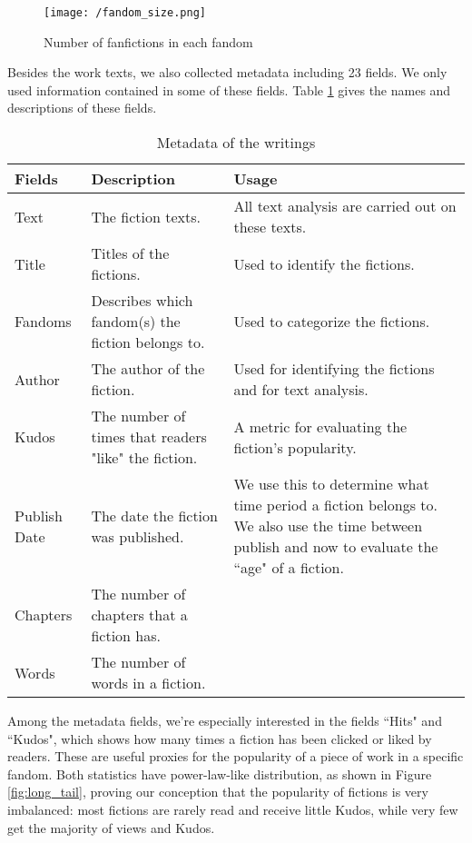 \documentclass[a4paper]{article}
\begin{document}
\begin{figure}[htbp]
\begin{center}
\texttt{[image: /fandom\_size.png]}
\caption{Number of fanfictions in each fandom}
\label{fig:fandom_size}
\end{center}
\end{figure}


Besides the work texts, we also collected metadata including 23 fields. We only used information contained in some of these fields. Table \ref{tab:metadata} gives the names and descriptions of these fields. 

\begin{table}[htp]
\caption{Metadata of the writings}
\begin{center}
\begin{tabular}[width=0.8\textwidth]{p{2cm}|p{4cm}|p{5cm}}
  \hline			
 Fields & Description & Usage\\ 
   \hline			
Text & The fiction texts. & All text analysis are carried out on these texts.\\\hline
Title & Titles of the fictions. & Used to identify the fictions. \\\hline
Fandoms & Describes which fandom(s) the fiction belongs to. & Used to categorize the fictions.\\\hline
Author & The author of the fiction. & Used for identifying the fictions and for text analysis. \\\hline
Kudos & The number of times that readers "like" the fiction. &  A metric for evaluating the fiction's popularity.\\\hline
Publish Date & The date the fiction was published. & We use this to determine what time period a fiction belongs to. We also use the time between publish and now to evaluate the ``age" of a fiction.\\\hline
Chapters & The number of chapters that a fiction has. \\\hline
Words & The number of words in a fiction.\\\hline

\hline
\end{tabular}
\end{center}
\label{tab:metadata}
\end{table}%

Among the metadata fields, we're especially interested in the fields ``Hits" and ``Kudos", which shows how many times a fiction has been clicked or liked by readers. These are useful proxies for the popularity of a piece of work in a specific fandom.
Both statistics have power-law-like distribution, as shown in  Figure \ref{fig:long_tail}, proving our conception that the popularity of fictions is very imbalanced: most fictions are rarely read and receive little Kudos, while very few get the majority of views and Kudos.
\end{document}

